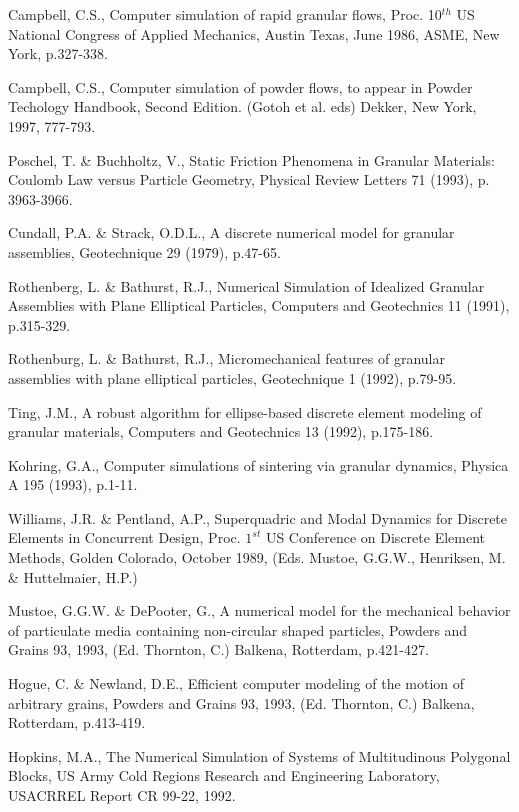 \documentclass[granma]{svjour}
\begin{document}
\begin{thebibliography}{19}
 Campbell, C.S., Computer simulation of rapid granular
flows, Proc. 10$^{th}$ US National Congress of Applied Mechanics, Austin
Texas, June 1986, ASME, New York, p.327-338.

 Campbell, C.S., Computer simulation of powder flows, to
appear in Powder Techology Handbook, Second Edition. (Gotoh et al. eds)
Dekker, New York, 1997, 777-793.

 Poschel, T. \& Buchholtz, V., Static
Friction Phenomena in
Granular Materials: Coulomb Law versus Particle Geometry, Physical Review
Letters 71 (1993), p. 3963-3966.

 Cundall, P.A. \& Strack, O.D.L., A discrete numerical model
for granular assemblies, Geotechnique 29 (1979), p.47-65.

 Rothenberg, L. \& Bathurst, R.J., Numerical Simulation of
Idealized Granular Assemblies with Plane Elliptical Particles, Computers and
Geotechnics 11 (1991), p.315-329.

 Rothenburg, L. \& Bathurst, R.J., Micromechanical features
of granular assemblies with plane elliptical particles, Geotechnique 1
(1992), p.79-95.

 Ting, J.M., A robust algorithm for ellipse-based discrete
element modeling of granular materials, Computers and Geotechnics 13 (1992),
p.175-186.

 Kohring, G.A., Computer simulations of
sintering via granular dynamics, Physica A 195 (1993), p.1-11.

 Williams, J.R. \& Pentland, A.P., Superquadric and Modal
Dynamics for Discrete Elements in Concurrent Design, Proc. $1^{st}$ US
Conference on Discrete Element Methods, Golden Colorado, October 1989, (Eds.
Mustoe, G.G.W., Henriksen, M. \& Huttelmaier, H.P.)

 Mustoe, G.G.W. \& DePooter, G., A numerical model for the
mechanical behavior of particulate media containing non-circular shaped
particles, Powders and Grains 93, 1993, (Ed. Thornton, C.) Balkena,
Rotterdam, p.421-427.

 Hogue, C. \& Newland, D.E., Efficient
computer modeling of
the motion of arbitrary grains, Powders and Grains 93, 1993, (Ed. Thornton,
C.) Balkena, Rotterdam, p.413-419.

 Hopkins, M.A., The Numerical Simulation of Systems of
Multitudinous Polygonal Blocks, US Army Cold Regions Research and Engineering
Laboratory, USACRREL Report CR 99-22, 1992.


\end{thebibliography}
\end{document}

